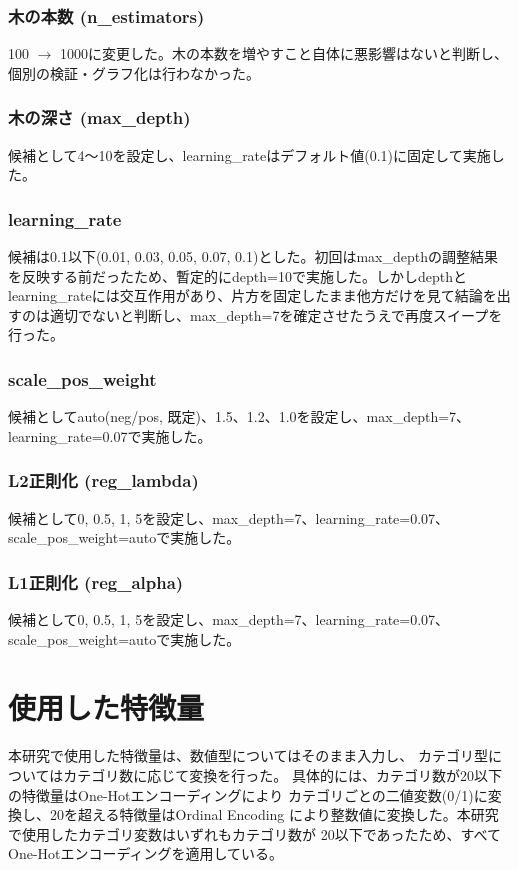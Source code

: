 \documentclass[dvipdfmx, a4paper, 11pt, titlepage]{jsarticle}
\begin{document}
\subsubsection{木の本数 (n\_estimators)}

100 $\to$ 1000に変更した。木の本数を増やすこと自体に悪影響はないと判断し、個別の検証・グラフ化は行わなかった。

\subsubsection{木の深さ (max\_depth)}

候補として4〜10を設定し、learning\_rateはデフォルト値(0.1)に固定して実施した。

\subsubsection{learning\_rate}

候補は0.1以下(0.01, 0.03, 0.05, 0.07, 0.1)とした。初回はmax\_depthの調整結果を反映する前だったため、暫定的にdepth=10で実施した。しかしdepthとlearning\_rateには交互作用があり、片方を固定したまま他方だけを見て結論を出すのは適切でないと判断し、max\_depth=7を確定させたうえで再度スイープを行った。

\subsubsection{scale\_pos\_weight}

候補としてauto(neg/pos, 既定)、1.5、1.2、1.0を設定し、max\_depth=7、learning\_rate=0.07で実施した。

\subsubsection{L2正則化 (reg\_lambda)}

候補として0, 0.5, 1, 5を設定し、max\_depth=7、learning\_rate=0.07、scale\_pos\_weight=autoで実施した。

\subsubsection{L1正則化 (reg\_alpha)}

候補として0, 0.5, 1, 5を設定し、max\_depth=7、learning\_rate=0.07、scale\_pos\_weight=autoで実施した。


\section{使用した特徴量}
本研究で使用した特徴量は、数値型についてはそのまま入力し、
カテゴリ型についてはカテゴリ数に応じて変換を行った。
具体的には、カテゴリ数が20以下の特徴量はOne-Hotエンコーディングにより
カテゴリごとの二値変数(0/1)に変換し、20を超える特徴量はOrdinal Encoding
により整数値に変換した。本研究で使用したカテゴリ変数はいずれもカテゴリ数が
20以下であったため、すべてOne-Hotエンコーディングを適用している。
\end{document}
